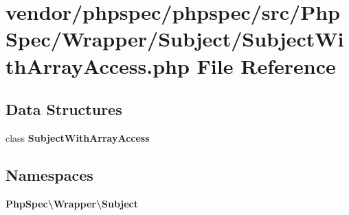 \section{vendor/phpspec/phpspec/src/\+Php\+Spec/\+Wrapper/\+Subject/\+Subject\+With\+Array\+Access.php File Reference}
\label{_subject_with_array_access_8php}
\subsection*{Data Structures}
\begin{DoxyCompactItemize}
\item 
class {\bf Subject\+With\+Array\+Access}
\end{DoxyCompactItemize}
\subsection*{Namespaces}
\begin{DoxyCompactItemize}
\item 
 {\bf Php\+Spec\textbackslash{}\+Wrapper\textbackslash{}\+Subject}
\end{DoxyCompactItemize}
